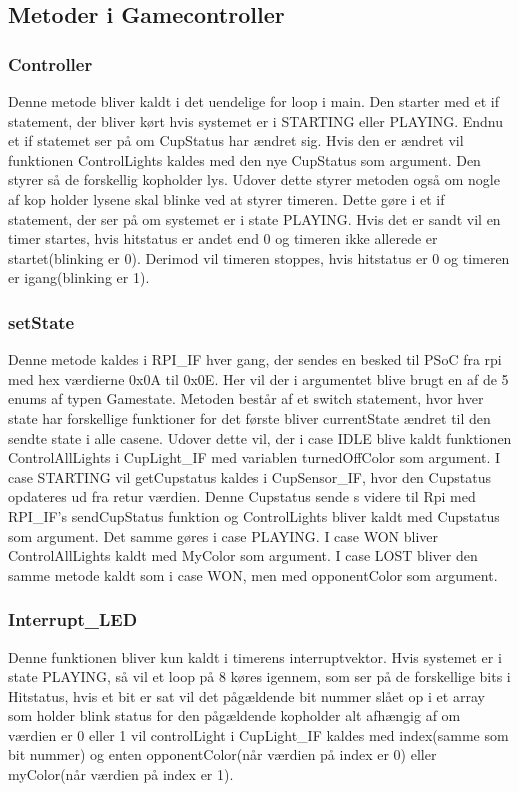 \documentclass[Softwaredesign/Softwaredesign_main.tex]{subfiles}
\begin{document}
\subsection{Metoder i Gamecontroller}
\subsubsection{Controller}
Denne metode bliver kaldt i det uendelige for loop i main. Den starter med et if statement, der bliver kørt hvis systemet er i STARTING eller PLAYING. Endnu et if statemet ser på om CupStatus har ændret sig. Hvis den er ændret vil funktionen ControlLights kaldes med den nye CupStatus som argument. Den styrer så de forskellig kopholder lys. Udover dette styrer metoden også om nogle af kop holder lysene skal blinke ved at styrer timeren. Dette gøre i et if statement, der ser på om systemet er i state PLAYING. Hvis det er sandt vil en timer startes, hvis hitstatus er andet end 0 og timeren ikke allerede er startet(blinking er 0). Derimod vil timeren stoppes, hvis hitstatus er 0 og timeren er igang(blinking er 1).
\subsubsection{setState}
Denne metode kaldes i RPI\_IF hver gang, der sendes en besked til PSoC fra rpi med hex værdierne 0x0A til 0x0E. Her vil der i argumentet blive brugt en af de 5 enums af typen Gamestate. Metoden består af et switch statement, hvor hver state har forskellige funktioner for det første bliver currentState ændret til den sendte state i alle casene. Udover dette vil, der i case IDLE blive kaldt funktionen ControlAllLights i CupLight\_IF med variablen turnedOffColor som argument. I case STARTING vil getCupstatus kaldes i CupSensor\_IF, hvor den Cupstatus opdateres ud fra retur værdien. Denne Cupstatus sende s videre til Rpi med RPI\_IF's sendCupStatus funktion og ControlLights bliver kaldt med Cupstatus som argument. Det samme gøres i case PLAYING. I case WON bliver ControlAllLights kaldt med MyColor som argument. I case LOST bliver den samme metode kaldt som i case WON, men med opponentColor som argument.
\subsubsection{Interrupt\_LED}
Denne funktionen bliver kun kaldt i timerens interruptvektor. Hvis systemet er i state PLAYING, så vil et loop på 8 køres igennem, som ser på de forskellige bits i Hitstatus, hvis et bit er sat vil det pågældende bit nummer slået op i et array som holder blink status for den pågældende kopholder alt afhængig af om værdien er 0 eller 1 vil controlLight i CupLight\_IF kaldes med index(samme som bit nummer) og enten opponentColor(når værdien på index er 0) eller myColor(når værdien på index er 1).
\end{document}

